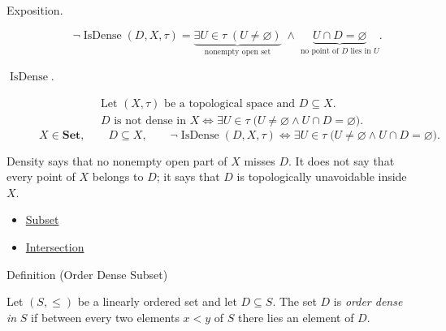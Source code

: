 \begin{remark*}
\begin{description}
\item[Exposition.]
\[
\neg\operatorname{IsDense}(D,X,\tau)
=
\underbrace{\exists U\in\tau\;(U\neq\varnothing)}_{\text{nonempty open set}}
\;\land\;
\underbrace{U\cap D=\varnothing}_{\text{no point of }D\text{ lies in }U}.
\]


  \item[\(\operatorname{IsDense}.\)]
  \[
\begin{aligned}
&\text{Let }(X,\tau)\text{ be a topological space and }D\subseteq X.\\
&D\text{ is not dense in }X
\Longleftrightarrow
\exists U\in\tau\;\bigl(U\neq\varnothing\land U\cap D=\varnothing\bigr).
\end{aligned}
\]
\[
X\in\mathbf{Set},\qquad D\subseteq X,\qquad
\neg\operatorname{IsDense}(D,X,\tau)\Longleftrightarrow
\exists U\in\tau\;\bigl(U\neq\varnothing\land U\cap D=\varnothing\bigr).
\]
\end{description}
\end{remark*}

\begin{remark*}[Interpretation]
Density says that no nonempty open part of $X$ misses $D$.  It does not
say that every point of $X$ belongs to $D$; it says that $D$ is
topologically unavoidable inside $X$.
\end{remark*}

\begin{dependencies}
\begin{itemize}
  \item \hyperref[def:subset]{Subset}
  \item \hyperref[def:intersection]{Intersection}
\end{itemize}
\end{dependencies}

\begin{definitionbox}{Definition (Order Dense Subset)}
\begin{definition}
\label{def:order-dense-subset}
Let $(S,\leq)$ be a linearly ordered set and let $D\subseteq S$.  The set
$D$ is \emph{order dense in} $S$ if between every two elements $x<y$ of
$S$ there lies an element of $D$.
\end{definition}
\end{definitionbox}

